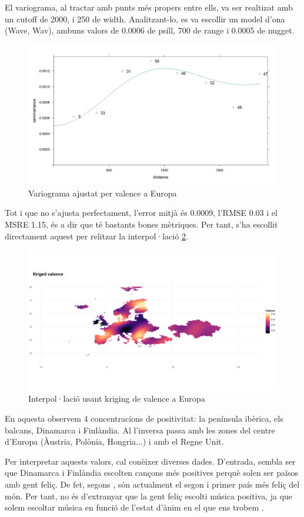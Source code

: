 El variograma, al tractar amb punts més propers entre ells, va ser realtizat amb un cutoff de 2000, i 250 de width. Analitzant-lo, es va escollir un model d'ona (Wave, Wav), ambuns valors de 0.0006 de psill, 700 de range i 0.0005 de nugget.

\begin{figure}[H]
    \centering
    \includegraphics[width=0.5\linewidth]{Images//7_Geospatial//3_new/valence_variogram.png}
    \caption{Variograma ajustat per valence a Europa}
    \label{fig:geo_new_val_fit}
\end{figure}

Tot i que no s'ajusta perfectament, l'error mitjà és 0.0009, l'RMSE 0.03 i el MSRE 1.15, és a dir que té bastants bones mètriques. Per tant, s'ha escollit directament aquest per relitzar la interpol·lació \ref{fig:geo_new_valence_interpol}.

\begin{figure}[H]
    \centering
    \includegraphics[width=0.8\linewidth]{Images//7_Geospatial//3_new/valence_interpolation.png}
    \caption{Interpol·lació usant kriging de valence a Europa}
    \label{fig:geo_new_valence_interpol}
\end{figure}

En aquesta observem 4 concentracions de positivitat: la península ibèrica, els balcans, Dinamarca i Finlàndia. Al l'inversa passa amb les zones del centre d'Europa (Àustria, Polònia, Hongria...) i amb el Regne Unit. 

Per interpretar aquests valors, cal conèixer diverses dades. D'entrada, sembla ser que Dinamarca i Finlàndia escolten cançons més positives perquè solen ser països amb gent feliç. De fet, segons , són actualment el segon i primer país més feliç del món. Per tant, no és d'extranyar que la gent feliç escolti música positiva, ja que solem escoltar música en funció de l'estat d'ànim en el que ens trobem \cite{worldhappiness2024}.

